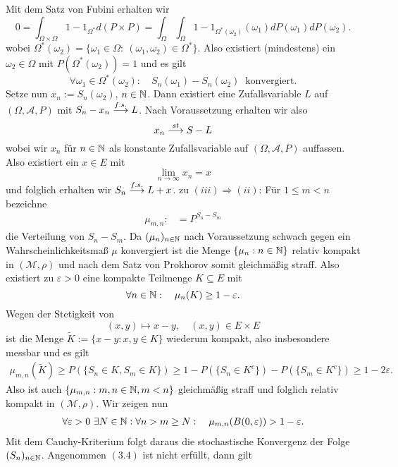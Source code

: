 \begin{proof*}
$$    $$
    Mit dem Satz von Fubini erhalten wir
    $$
        0 = \int_{\Omega \times \Omega}1 - 1_{\Omega^*} d(P \times P) = \int_{\Omega}\int_{\Omega}1 - 1_{\Omega^*(\omega_2)}(\omega_1)dP(\omega_1)dP(\omega_2). 
    $$
    wobei $\Omega^*(\omega_2) = \{\omega_1 \in \Omega: \ (\omega_1, \omega_2) \in \Omega^* \}$. Also existiert (mindestens) ein $\omega_2 \in \Omega$ mit $P(\Omega^*(\omega_2)) = 1$ und es gilt
    $$
        \forall \omega_1 \in \Omega^*(\omega_2): \quad S_n(\omega_1) - S_n(\omega_2) \ \text{ konvergiert.}
    $$
    Setze nun $x_n := S_n(\omega_2)$, $n \in \mathbb{N}$. Dann existiert eine Zufallsvariable $L$ auf $(\Omega, \mathcal{A}, P)$ mit $S_n - x_n \overset{f.s.}{\longrightarrow} L$. Nach Voraussetzung erhalten wir also 
    $$
        x_n \overset{st}{\longrightarrow} S - L
    $$
    wobei wir $x_n$ für $n \in \mathbb{N}$ als konstante Zufallsvariable auf $(\Omega, \mathcal{A}, P)$ auffassen. Also existiert ein $x \in E$ mit 
    $$
        \lim_{n \to \infty}x_n = x
    $$
    und folglich erhalten wir $S_n \overset{f.s.}{\longrightarrow} L + x$. 
    \newline 
    zu $(iii) \Rightarrow (ii)$: Für $1 \leq m < n$ bezeichne
    \begin{align*}
        \mu_{m,n} :&= P^{S_n - S_m}
    \end{align*}
    die Verteilung von $S_n - S_m$. Da $(\mu_n)_{n \in \mathbb{N}}$ nach Voraussetzung schwach gegen ein Wahrscheinlichkeitsmaß $\mu$ konvergiert
    ist die Menge $\{\mu_n: n \in \mathbb{N} \}$ relativ kompakt in $(\mathcal{M}, \rho)$ und nach dem Satz von Prokhorov somit gleichmäßig straff.
    Also existiert zu $\varepsilon > 0$ eine kompakte Teilmenge $K \subseteq E$ mit 
    $$
        \forall n \in \mathbb{N}: \quad \mu_n(K) \geq 1 - \varepsilon. 
    $$
    Wegen der Stetigkeit von 
    $$
        (x,y) \mapsto x - y, \quad (x,y) \in E \times E
    $$
    ist die Menge $\tilde{K} := \{x - y : x,y \in K \}$ wiederum kompakt, also insbesondere messbar und es gilt
    \begin{align*}
        \mu_{m,n}(\tilde{K}) \geq P(\{S_n \in K, S_m \in K\}) \geq 1 - P(\{S_n \in K^c\}) - P(\{S_m \in K^c\}) \geq 1 - 2\varepsilon.
    \end{align*}
    Also ist auch $\{\mu_{m,n}: m,n \in \mathbb{N}, m < n \}$ gleichmäßig straff und folglich relativ kompakt in $(\mathcal{M}, \rho)$. 
    Wir zeigen nun
    \begin{align}
        \forall \varepsilon > 0 \ \exists N \in \mathbb{N}: \forall n > m \geq N: \quad \mu_{m,n}(B(0,\varepsilon)) > 1 - \varepsilon.
    \end{align}
    Mit dem Cauchy-Kriterium folgt daraus die stochastische Konvergenz der Folge $(S_n)_{n \in \mathbb{N}}$. Angenommen $(3.4)$ ist nicht erfüllt, dann gilt

\end{proof*}
